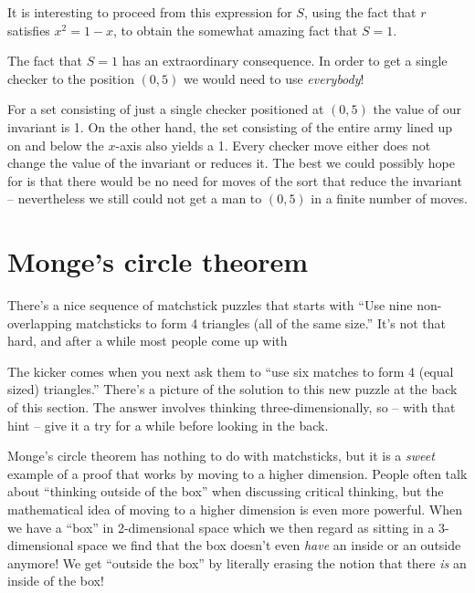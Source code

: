 It is interesting to proceed from this expression for $S$,
using the fact that $r$ satisfies $x^2 = 1 - x$, to obtain the somewhat
amazing fact that $S=1$. 

The fact that $S=1$ has an extraordinary consequence.
In order to get a single
checker to the position $(0,5)$ we would need to use \emph{everybody}!

For a set consisting of just a single
checker positioned at $(0,5)$ the value of our invariant is 1.
On the other hand, the set consisting of the entire army lined 
up on and below the $x$-axis also yields a 1.  Every checker move either
does not change the value of the invariant or reduces it.  The best 
we could possibly hope for is that there would be no need for moves 
of the sort that reduce
the invariant -- nevertheless we still could not get a man to $(0,5)$ 
in a finite number of moves.

\clearpage




\newpage

\section{Monge's circle theorem}

There's a nice sequence of matchstick puzzles that starts with
``Use nine non-overlapping matchsticks to form 4 triangles (all of
the same size.''  It's not that hard, and after a while most people come
up with 


\begin{center}

\end{center}

The kicker comes when you next ask them to ``use six matches to form
4 (equal sized) triangles.''   There's a picture of the solution to
this new puzzle at the back of this section.  The answer involves 
thinking three-dimensionally, so -- with that hint -- give it a try for a
while before looking in the back.

Monge's circle theorem has 
nothing to do with matchsticks, but it is a
\emph{sweet} example of a proof that works by moving to a higher dimension.
People often talk about ``thinking outside of the box'' when discussing
critical thinking, but the mathematical idea of moving to a higher dimension
is even more powerful.  When we have a ``box'' in 2-dimensional space which
we then regard as sitting in a 3-dimensional space we find that the box
doesn't even \emph{have} an inside or an outside anymore!  We get ``outside 
the box'' by literally erasing the notion that there \emph{is} an inside
of the box!

